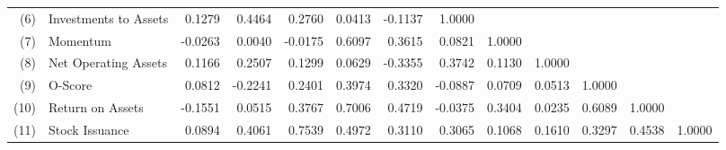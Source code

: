 \documentclass[a4paper]{article}                 %
\begin{document}
\begin{table}[h!]
{\begin{tabular}{@{}rlrrrrrrrrrrr@{}}
(6) & Investments to Assets & 0.1279 & 0.4464 & 0.2760 & 0.0413 & -0.1137 & 1.0000 &  &  &  &  &  \\
(7) & Momentum & -0.0263 & 0.0040 & -0.0175 & 0.6097 & 0.3615 & 0.0821 & 1.0000 &  &  &  &  \\
(8) & Net Operating Assets & 0.1166 & 0.2507 & 0.1299 & 0.0629 & -0.3355 & 0.3742 & 0.1130 & 1.0000 &  &  &  \\
(9) & O-Score & 0.0812 & -0.2241 & 0.2401 & 0.3974 & 0.3320 & -0.0887 & 0.0709 & 0.0513 & 1.0000 &  &  \\
(10) & Return on Assets & -0.1551 & 0.0515 & 0.3767 & 0.7006 & 0.4719 & -0.0375 & 0.3404 & 0.0235 & 0.6089 & 1.0000 &  \\
(11) & Stock Issuance & 0.0894 & 0.4061 & 0.7539 & 0.4972 & 0.3110 & 0.3065 & 0.1068 & 0.1610 & 0.3297 & 0.4538 & 1.0000 \\ \bottomrule
\end{tabular}%
}
\end{table}
\end{document}
